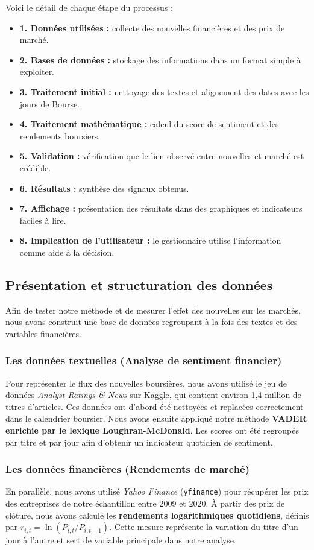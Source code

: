 \documentclass[11pt,a4paper]{article}
\begin{document}
Voici le détail de chaque étape du processus :
\begin{itemize}
    \item \textbf{1. Données utilisées :} collecte des nouvelles financières et des prix de marché.
    \item \textbf{2. Bases de données :} stockage des informations dans un format simple à exploiter.
    \item \textbf{3. Traitement initial :} nettoyage des textes et alignement des dates avec les jours de Bourse.
    \item \textbf{4. Traitement mathématique :} calcul du score de sentiment et des rendements boursiers.
    \item \textbf{5. Validation :} vérification que le lien observé entre nouvelles et marché est crédible.
    \item \textbf{6. Résultats :} synthèse des signaux obtenus.
    \item \textbf{7. Affichage :} présentation des résultats dans des graphiques et indicateurs faciles à lire.
    \item \textbf{8. Implication de l'utilisateur :} le gestionnaire utilise l'information comme aide à la décision.
\end{itemize}

\subsection{Présentation et structuration des données}

Afin de tester notre méthode et de mesurer l'effet des nouvelles sur les marchés, nous avons construit une base de données regroupant à la fois des textes et des variables financières.

\subsubsection{Les données textuelles (Analyse de sentiment financier)}
Pour représenter le flux des nouvelles boursières, nous avons utilisé le jeu de données \textit{Analyst Ratings \& News} sur Kaggle, qui contient environ 1,4 million de titres d'articles. Ces données ont d'abord été nettoyées et replacées correctement dans le calendrier boursier.
Nous avons ensuite appliqué notre méthode \textbf{VADER enrichie par le lexique Loughran-McDonald}. Les scores ont été regroupés par titre et par jour afin d'obtenir un indicateur quotidien de sentiment.

\subsubsection{Les données financières (Rendements de marché)}
En parallèle, nous avons utilisé \textit{Yahoo Finance} (\texttt{yfinance}) pour récupérer les prix des entreprises de notre échantillon entre 2009 et 2020. À partir des prix de clôture, nous avons calculé les \textbf{rendements logarithmiques quotidiens}, définis par $r_{i,t} = \ln(P_{i,t} / P_{i,t-1})$. Cette mesure représente la variation du titre d'un jour à l'autre et sert de variable principale dans notre analyse.
\end{document}
